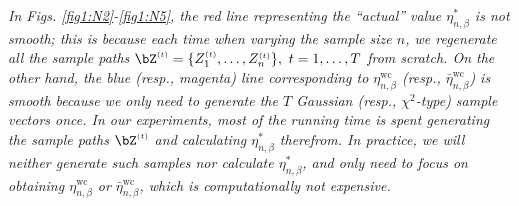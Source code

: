 \documentclass[10pt, twocolumn]{IEEEtran}
\begin{document}

\begin{rem} \label{re5} \emph{In Figs. \ref{fig1:N2}-\ref{fig1:N5}, the red line representing the ``actual'' value
		$\eta^{*}_{n,\beta}$ is not smooth; this is because each time when varying the
		sample size $n$, we regenerate all the sample paths
		${{\bZ}^{\scriptscriptstyle{( t )}}} = \{ {Z_1^{\scriptscriptstyle{(
					t )}}, \ldots ,Z_n^{\scriptscriptstyle{( t )}}} \}, ~t = 1,
		\ldots ,T$ from scratch. On the other hand, the blue (resp., magenta) line
		corresponding to $\eta_{n,\beta}^{\text{wc}}$ (resp., $\bar \eta_{n,\beta}^{\text{wc}}$) is smooth because we only need to
		generate the $T$ Gaussian (resp., $\chi^2$-type) sample vectors once. In our experiments, most of the
		running time is spent generating the sample paths
		${{\bZ}^{\scriptscriptstyle{( t )}}}$ and calculating $\eta^{*}_{n,\beta}$
		therefrom. In practice, we
		will neither generate such samples nor calculate $\eta^{*}_{n,\beta}$, and only
		need to focus on obtaining $\eta_{n,\beta}^{\text{wc}}$ or $\bar \eta_{n,\beta}^{\text{wc}}$, which is 
		computationally not expensive.}
\end{rem}
\end{document}
